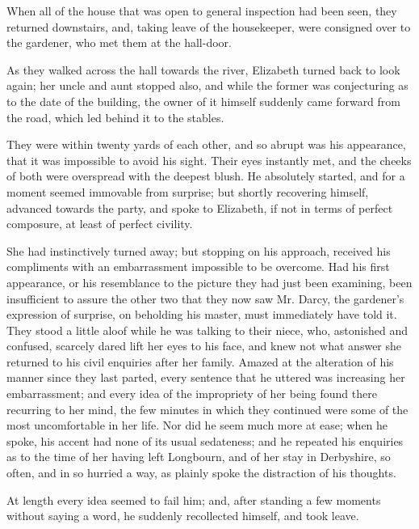 When all of the house that was open to general inspection had been seen, they returned downstairs, and, taking leave of the housekeeper, were consigned over to the gardener, who met them at the hall-door.

As they walked across the hall towards the river, Elizabeth turned back to look again; her uncle and aunt stopped also, and while the former was conjecturing as to the date of the building, the owner of it himself suddenly came forward from the road, which led behind it to the stables.

They were within twenty yards of each other, and so abrupt was his appearance, that it was impossible to avoid his sight. Their eyes instantly met, and the cheeks of both were overspread with the deepest blush. He absolutely started, and for a moment seemed immovable from surprise; but shortly recovering himself, advanced towards the party, and spoke to Elizabeth, if not in terms of perfect composure, at least of perfect civility.

She had instinctively turned away; but stopping on his approach, received his compliments with an embarrassment impossible to be overcome. Had his first appearance, or his resemblance to the picture they had just been examining, been insufficient to assure the other two that they now saw Mr. Darcy, the gardener's expression of surprise, on beholding his master, must immediately have told it. They stood a little aloof while he was talking to their niece, who, astonished and confused, scarcely dared lift her eyes to his face, and knew not what answer she returned to his civil enquiries after her family. Amazed at the alteration of his manner since they last parted, every sentence that he uttered was increasing her embarrassment; and every idea of the impropriety of her being found there recurring to her mind, the few minutes in which they continued were some of the most uncomfortable in her life. Nor did he seem much more at ease; when he spoke, his accent had none of its usual sedateness; and he repeated his enquiries as to the time of her having left Longbourn, and of her stay in Derbyshire, so often, and in so hurried a way, as plainly spoke the distraction of his thoughts.

At length every idea seemed to fail him; and, after standing a few moments without saying a word, he suddenly recollected himself, and took leave.

